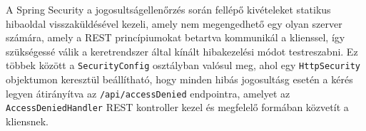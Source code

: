A Spring Security a jogosultságellenőrzés során fellépő kivételeket statikus hibaoldal visszaküldésével kezeli, amely nem megengedhető egy olyan szerver számára, amely a REST princípiumokat betartva kommunikál a klienssel, így szükségessé válik a keretrendszer által kínált hibakezelési módot testreszabni. Ez többek között a \texttt{SecurityConfig} osztályban valósul meg, ahol egy \texttt{HttpSecurity} objektumon keresztül beállítható, hogy minden hibás jogosultásg esetén a kérés legyen átirányítva az \texttt{/api/accessDenied} endpointra, amelyet az \texttt{AccessDeniedHandler} REST kontroller kezel és megfelelő formában közvetít a kliensnek.
